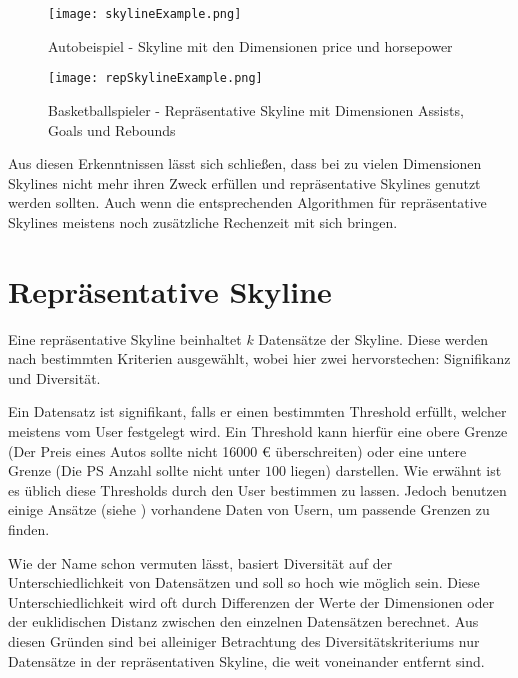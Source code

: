 \begin{figure}[H]
	\centering	 
\begin{adjustbox}{max size={\textwidth}{\textheight}}
    \texttt{[image: skylineExample.png]}
\end{adjustbox}
\caption{Autobeispiel - Skyline mit den Dimensionen price und horsepower}
	\label{img:skylineExample}
\end{figure}


\begin{figure}[H]
	\centering
	\begin{adjustbox}{max size={\textwidth}{\textheight}}
    \texttt{[image: repSkylineExample.png]}
\end{adjustbox}
	\caption{Basketballspieler - Repräsentative Skyline mit Dimensionen Assists, Goals und Rebounds}
	\label{img:repSkylineExample}
\end{figure}

Aus diesen Erkenntnissen lässt sich schließen, dass bei zu vielen Dimensionen Skylines nicht mehr ihren Zweck erfüllen und repräsentative Skylines genutzt werden sollten. Auch wenn die entsprechenden Algorithmen für repräsentative Skylines meistens noch zusätzliche Rechenzeit mit sich bringen.
\section{Repräsentative Skyline}
\label{ch:Grundlagen:sec:repSkyline}
Eine repräsentative Skyline beinhaltet $k$ Datensätze der Skyline. Diese werden nach bestimmten Kriterien ausgewählt, wobei hier zwei hervorstechen: Signifikanz und Diversität.

Ein Datensatz ist signifikant, falls er einen bestimmten Threshold erfüllt, welcher meistens vom User festgelegt wird. Ein Threshold kann hierfür eine obere Grenze (Der Preis eines Autos sollte nicht 16000 \euro{} überschreiten) oder eine untere Grenze (Die PS Anzahl sollte nicht unter $100$ liegen) darstellen. 
Wie erwähnt ist es üblich diese Thresholds durch den User bestimmen zu lassen. Jedoch benutzen einige Ansätze (siehe \cite{36988}) vorhandene Daten von Usern, um passende Grenzen zu finden.

Wie der Name schon vermuten lässt, basiert Diversität auf der Unterschiedlichkeit von Datensätzen und soll so hoch wie möglich sein. Diese Unterschiedlichkeit wird oft durch Differenzen der Werte der Dimensionen oder der euklidischen Distanz zwischen den einzelnen Datensätzen berechnet. 
Aus diesen Gründen sind bei alleiniger Betrachtung des Diversitätskriteriums nur Datensätze in der repräsentativen Skyline, die weit voneinander entfernt sind. 

